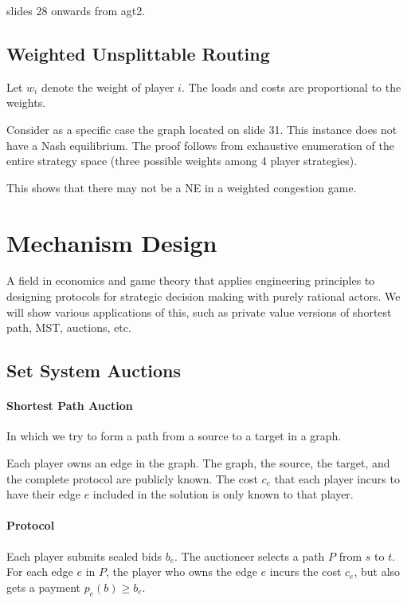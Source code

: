 \documentclass{idc_msc}
\begin{document}
slides 28 onwards from agt2.

\subsection{Weighted Unsplittable Routing}

Let \(w_i\) denote the weight of player \(i\).
The loads and costs are proportional to the weights.

Consider as a specific case the graph located on slide 31.
This instance does not have a Nash equilibrium.
The proof follows from exhaustive enumeration of the entire strategy space (three possible weights among 4 player strategies).

This shows that there may not be a NE in a weighted congestion game.

\section{Mechanism Design}

A field in economics and game theory that applies engineering principles to designing protocols for strategic decision making with purely rational actors.
We will show various applications of this, such as private value versions of shortest path, MST, auctions, etc.

\subsection{Set System Auctions}

\paragraph{Shortest Path Auction}

In which we try to form a path from a source to a target in a graph.

Each player owns an edge in the graph.
The graph, the source, the target, and the complete protocol are publicly known.
The cost \(c_e\) that each player incurs to have their edge \(e\) included in the solution is only known to that player.

\paragraph{Protocol}

Each player submits sealed bids \(b_e\).
The auctioneer selects a path \(P\) from \(s\) to \(t\).
For each edge \(e\) in \(P\), the player who owns the edge \(e\) incurs the cost \(c_e\), but also gets a payment \(p_e(b) \ge b_e\).
\end{document}
